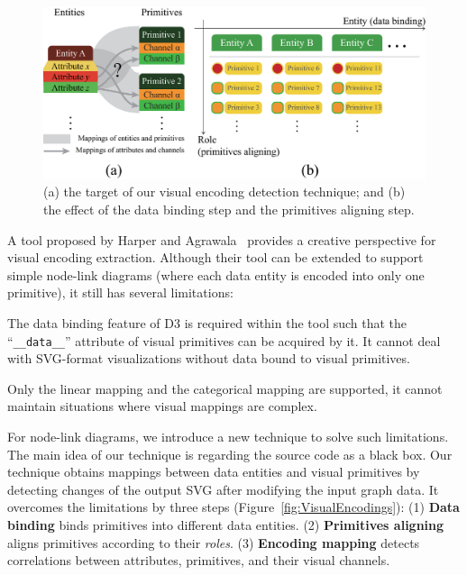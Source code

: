 \begin{figure}
    \centering
    \includegraphics[width=1\columnwidth]{figures/PrimitiveAligning.eps}
    \caption{(a) the target of our visual encoding detection technique; and (b) the effect of the data binding step and the primitives aligning step.}
    \label{fig:PrimitiveAligning}
\end{figure}

A tool proposed by Harper and Agrawala~\cite{DBLP:conf/uist/HarperA14} provides a creative perspective for visual encoding extraction.
Although their tool can be extended to support simple node-link diagrams (where each data entity is encoded into only one primitive), it still has several limitations:
\begin{compactenum}
\item The data binding feature of D3 is required within the tool such that the ``\texttt{\_\_data\_\_}'' attribute of visual primitives can be acquired by it. 
It cannot deal with SVG-format visualizations without data bound to visual primitives.

\item Only the linear mapping and the categorical mapping are supported, it cannot maintain situations where visual mappings are complex.
\end{compactenum}

For node-link diagrams, we introduce a new technique to solve such limitations.
The main idea of our technique is regarding the source code as a black box.
Our technique obtains mappings between data entities and visual primitives by detecting changes of the output SVG after modifying the input graph data.
It overcomes the limitations by three steps (Figure~\ref{fig:VisualEncodings}):
(1) \textbf{Data binding} binds primitives into different data entities.
(2) \textbf{Primitives aligning} aligns primitives according to their \textit{roles}. 
(3) \textbf{Encoding mapping} detects correlations between attributes, primitives, and their visual channels.

